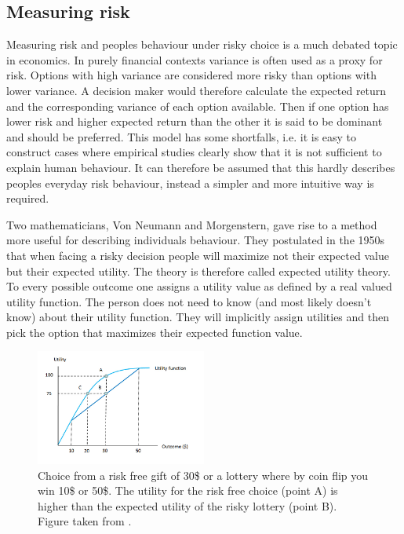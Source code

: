 \subsection{Measuring risk}

Measuring risk and peoples behaviour under risky choice is a much debated topic in economics. In purely financial contexts variance is often used as a proxy for risk. Options with high variance are considered more risky than options with lower variance. 
A decision maker would therefore calculate the expected return and the corresponding variance of each option available.
Then if one option has lower risk and higher expected return than the other it is said to be dominant and should be preferred.
This model has some shortfalls, i.e. it is easy to construct cases where empirical studies clearly show that it is not sufficient to explain human behaviour.
It can therefore be assumed that this hardly describes peoples everyday risk behaviour, instead a simpler and more intuitive way is required. \cite{Jaeger00}

Two mathematicians, Von Neumann and Morgenstern, gave rise to a method more useful for describing individuals behaviour. They postulated in the 1950s that when facing a risky decision people will maximize not their expected value but their expected utility. \cite{Morgenstern53}
The theory is therefore called expected utility theory. \cite{Grant07}
To every possible outcome one assigns a utility value as defined by a real valued utility function. The person does not need to know (and most likely doesn't know) about their utility function. They will implicitly assign utilities and then pick the option that maximizes their expected function value.


\begin{figure}[ht]
\centering
\includegraphics[width=0.5\textwidth]{img/background/riskaversion}%
\caption{Choice from a risk free gift of 30\$ or a lottery where by coin flip you win 10\$ or 50\$. The utility for the risk free choice (point A) is higher than the expected utility of the risky lottery (point B). Figure taken from \cite{pic_risk}. 
}
\label{fig:background:riskaversion}
\end{figure}


